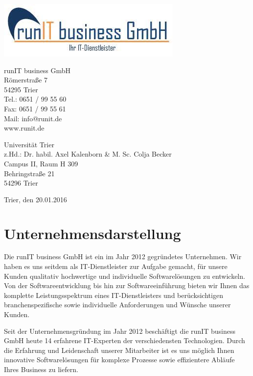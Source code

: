 \documentclass[10pt,a4paper]{article}
\begin{document}
\begin{center}

\includegraphics[scale=.75]{logo.jpg}
\end{center}

\begin{flushright}
runIT business GmbH \\
Römerstraße 7\\
54295 Trier\\
Tel.: 0651 / 99 55 60\\
Fax: 0651 / 99 55 61\\
Mail: info@runit.de\\
www.runit.de\\
\end{flushright}

\begin{flushleft}
Universität Trier\\
z.Hd.: Dr. habil. Axel Kalenborn \& M. Sc. Colja Becker\\
Campus II, Raum H 309\\
Behringstraße 21\\
54296 Trier\\
\end{flushleft}

\begin{flushright}
Trier, den 20.01.2016
\end{flushright}

\tableofcontents

\section{Unternehmensdarstellung}
Die runIT business GmbH ist ein im Jahr 2012 gegründetes Unternehmen. Wir haben es uns seitdem als IT-Dienstleister zur Aufgabe gemacht, für unsere Kunden qualitativ hochwertige und individuelle Softwarelösungen zu entwickeln. Von der Softwareentwicklung bis hin zur Softwareeinführung bieten wir Ihnen das komplette Leistungsspektrum eines IT-Dienstleisters und berücksichtigen branchenspezifische sowie individuelle Anforderungen und Wünsche unserer Kunden. 

Seit der Unternehmensgründung im Jahr 2012 beschäftigt die runIT business GmbH heute 14 erfahrene IT-Experten der verschiedensten Technologien. Durch die Erfahrung und Leidenschaft unserer Mitarbeiter ist es uns möglich Ihnen innovative Softwarelösungen für komplexe Prozesse sowie effizientere Abläufe Ihres Business zu liefern. 
\end{document}
